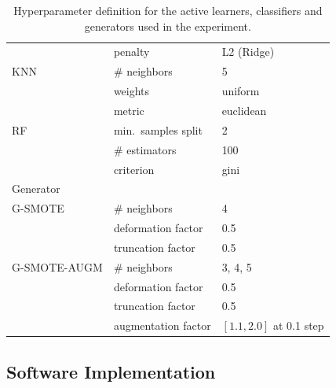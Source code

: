 \documentclass[preprint, 12pt]{elsarticle}
\begin{document}
\begin{table}[H]
\begin{tabular}{lll}
                        & penalty                          & L2 (Ridge)                     \\
		KNN             & \# neighbors                     & 5                              \\
                        & weights                          & uniform                        \\
                        & metric                           & euclidean                      \\
		RF              & min.\ samples split              & 2                              \\
		                & \# estimators                    & 100                            \\
                        & criterion                        & gini                           \\
		\toprule
		Generator       &                                  &                                \\
		\midrule
		G-SMOTE         & \# neighbors                     & 4                              \\
                        & deformation factor               & 0.5                            \\
                        & truncation factor                & 0.5                            \\
		G-SMOTE-AUGM    & \# neighbors                     & 3, 4, 5                        \\
                        & deformation factor               & 0.5                            \\
                        & truncation factor                & 0.5                            \\
                        & augmentation factor              & $[1.1, 2.0]$ at 0.1 step       \\
		\bottomrule
	\end{tabular}
    \caption{\label{tab:grid}
        Hyperparameter definition for the active learners, classifiers and
        generators used in the experiment.
    }
\end{table}
 
\subsection{Software Implementation}~\label{sec:software_implementation}
\end{document}
